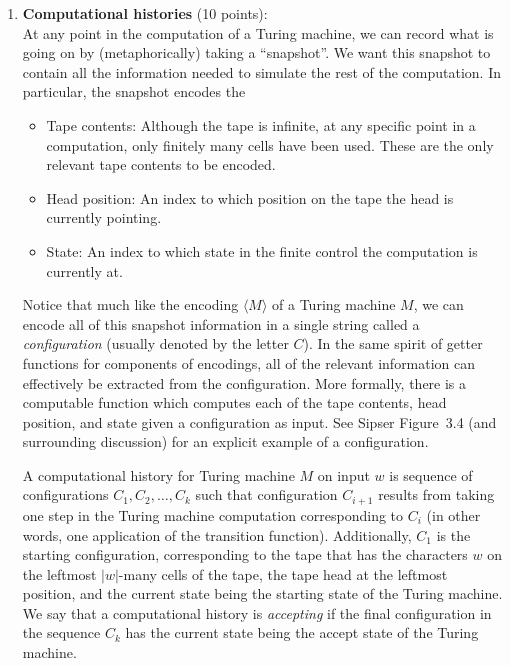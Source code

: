 \documentclass[12pt, oneside]{article}
\begin{document}
\begin{enumerate}
\item \textbf{Computational histories} (10 points): \\
At any point in the computation of a Turing machine, we can 
record what is going on by (metaphorically) taking a ``snapshot''. 
We want this snapshot to contain all the information needed to simulate the rest of the computation. In particular, the snapshot encodes the
\begin{itemize}
\item Tape contents:  Although the tape is infinite, at any 
specific point in a computation, only finitely many cells have 
been used. These are the only relevant tape contents to be encoded.
\item Head position: An index to which position on the tape the head is currently pointing.
\item State: An index to which state in the finite control the computation is currently at.
\end{itemize}
Notice that much like the encoding  $\langle M \rangle$ of a 
Turing machine $M$, we can encode all of this snapshot 
information in a single string called a \emph{configuration} 
(usually denoted by the letter $C$). In the same spirit
of getter functions for components of encodings, all 
of the relevant information can effectively be extracted from 
the configuration. More formally, there is a computable 
function which computes each of the tape contents, head 
position, and state given a configuration as input. See Sipser 
Figure~3.4 (and surrounding discussion) for an explicit 
example of a configuration.

A computational history for Turing machine $M$ on input $w$ is 
sequence of configurations $C_1, C_2, \ldots, C_k$ such that 
configuration $C_{i+1}$ results from taking one step in the 
Turing machine computation corresponding to $C_i$
(in other words, one application of the transition
function). Additionally, $C_1$ is the starting configuration, 
corresponding to the tape that has the characters $w$ on 
the leftmost $|w|$-many cells of the tape, the tape head at 
the leftmost position, and the current state being the 
starting state of the Turing machine. We say that a 
computational history is {\it accepting} if the final 
configuration in the sequence $C_k$ has 
the current state being the accept state of the Turing machine.


\end{enumerate}
\end{document}
